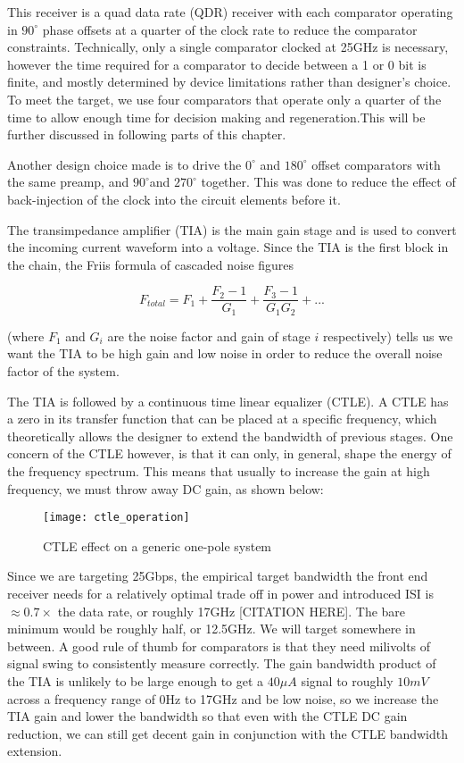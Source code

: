 This receiver is a quad data rate (QDR) receiver with each comparator operating in $90^\circ$ phase offsets at a quarter of the clock rate to reduce the comparator constraints. Technically, only a single comparator clocked at 25GHz is necessary, however the time required for a comparator to decide between a 1 or 0 bit is finite, and mostly determined by device limitations rather than designer's choice. To meet the target, we use four comparators that operate only a quarter of the time to allow enough time for decision making and regeneration.This will be further discussed in following parts of this chapter.

Another design choice made is to drive the $0^\circ$ and $180^\circ$ offset comparators with the same preamp, and $90^\circ$and $270^\circ$ together. This was done to reduce the effect of back-injection of the clock into the circuit elements before it.

The transimpedance amplifier (TIA) is the main gain stage and is used to convert the incoming current waveform into a voltage. Since the TIA is the first block in the chain, the Friis formula of cascaded noise figures

\begin{equation}
\label{friis}
F_{total}=F_1+\frac{F_2-1}{G_1}+\frac{F_3-1}{G_1G_2}+...
\end{equation}

(where $F_1$ and $G_i$ are the noise factor and gain of stage $i$ respectively) tells us we want the TIA to be high gain and low noise in order to reduce the overall noise factor of the system.

The TIA is followed by a continuous time linear equalizer (CTLE). A CTLE has a zero in its transfer function that can be placed at a specific frequency, which theoretically allows the designer to extend the bandwidth of previous stages. One concern of the CTLE however, is that it can only, in general, shape the energy of the frequency spectrum. This means that usually to increase the gain at high frequency, we must throw away DC gain, as shown below:

\begin{figure}[h]
\centering
\texttt{[image: ctle\_operation]}
\caption{CTLE effect on a generic one-pole system}
\label{fig:CTLE Operation}
\end{figure}

Since we are targeting 25Gbps, the empirical target bandwidth the front end receiver needs for a relatively optimal trade off in power and introduced ISI is $\approx 0.7\times$ the data rate, or roughly 17GHz [CITATION HERE]. The bare minimum would be roughly half, or 12.5GHz. We will target somewhere in between. A good rule of thumb for comparators is that they need milivolts of signal swing to consistently measure correctly. The gain bandwidth product of the TIA is unlikely to be large enough to get a $40\mu A$ signal to roughly $10mV$ across a frequency range of 0Hz to 17GHz and be low noise, so we increase the TIA gain and lower the bandwidth so that even with the CTLE DC gain reduction, we can still get decent gain in conjunction with the CTLE bandwidth extension. 

